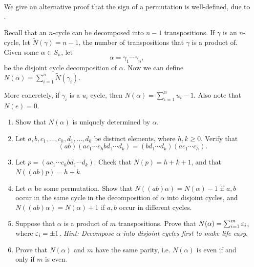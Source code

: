 \documentclass[./main.tex]{subfiles}
\begin{document}
\begin{exercise}
\label{ex:jacobson-permutation-sign}
    We give an alternative proof that the sign of a permutation is well-defined,
    due to \autocite[\pno~50]{Jacobson_2009}.

    Recall that an $n$-cycle can be decomposed into $n-1$ transpositions. If
    $\gamma$ is an $n$-cycle, let $\tilde N(\gamma) = n - 1$, the number of
    transpositions that $\gamma$ is a product of.  Given some $\alpha \in S_n$,
    let
    \[
        \alpha = \gamma_1 \cdots \gamma_n,
    \]
    be the disjoint cycle decomposition of $\alpha$. Now we can define
    $N(\alpha) = \sum_{i=1}^n \tilde N(\gamma_i)$. 
    
    More concretely, if $\gamma_i$ is a $u_i$ cycle, then $N(\alpha) =
    \sum_{i=1}^n u_i - 1$. Also note that $N(e) = 0$.
    \begin{enumerate}[label=(\alph*)]
        \item Show that $N(\alpha)$ is uniquely determined by $\alpha$. 
        \item Let $a, b, c_1, \dots, c_h, d_1, \dots, d_k$ be distinct elements,
        where $h, k \geq 0$. Verify that 
        \[
            (ab)(ac_1 \cdots c_h b d_1 \cdots d_k) = (bd_1 \cdots d_k)(ac_1 \cdots c_h).
        \]
        \item Let $p = (ac_1 \cdots c_h b d_1 \cdots d_k)$. Check that $N(p) = h
        + k + 1$, and that $N((ab)p) = h + k$. 
        \item Let $\alpha$ be some permutation. Show that $N((ab) \alpha) =
        N(\alpha) - 1$ if $a, b$ occur in the same cycle in the decomposition of
        $\alpha$ into disjoint cycles, and $N((ab)\alpha) = N(\alpha) + 1$ if
        $a, b$ occur in different cycles. 
        \item Suppose that $\alpha$ is a product of $m$ transpositions. Prove
        that $N(\alpha) = \sum_{i=1}^m \varepsilon_i$, where $\varepsilon_i = \pm 1$.
        \textit{Hint: Decompose $\alpha$ into disjoint cycles first to make life
        easy}.
        \item Prove that $N(\alpha)$ and $m$ have the same parity, i.e.
        $N(\alpha)$ is even if and only if $m$ is even.
    \end{enumerate}
\end{exercise}
\end{document}

